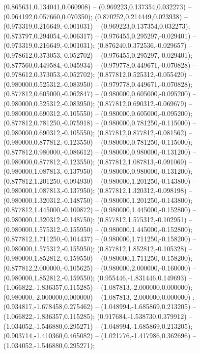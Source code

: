  (0.865631,0.134041,0.060908) -- (0.969223,0.137354,0.032273) -- (0.964192,0.057660,0.070350);
 (0.870252,0.214449,0.023938) -- (0.973319,0.216649,-0.001031) -- (0.969223,0.137354,0.032273);
 (0.873797,0.294054,-0.006317) -- (0.976455,0.295297,-0.029401) -- (0.973319,0.216649,-0.001031);
 (0.876240,0.372536,-0.029657) -- (0.978612,0.373053,-0.052702) -- (0.976455,0.295297,-0.029401);
 (0.877560,0.449584,-0.045934) -- (0.979778,0.449671,-0.070828) -- (0.978612,0.373053,-0.052702);
 (0.877812,0.525312,-0.055420) -- (0.980000,0.525312,-0.083950) -- (0.979778,0.449671,-0.070828);
 (0.877812,0.605000,-0.062847) -- (0.980000,0.605000,-0.095200) -- (0.980000,0.525312,-0.083950);
 (0.877812,0.690312,-0.069679) -- (0.980000,0.690312,-0.105550) -- (0.980000,0.605000,-0.095200);
 (0.877812,0.781250,-0.075918) -- (0.980000,0.781250,-0.115000) -- (0.980000,0.690312,-0.105550);
 (0.877812,0.877812,-0.081562) -- (0.980000,0.877812,-0.123550) -- (0.980000,0.781250,-0.115000);
 (0.877812,0.980000,-0.086612) -- (0.980000,0.980000,-0.131200) -- (0.980000,0.877812,-0.123550);
 (0.877812,1.087813,-0.091069) -- (0.980000,1.087813,-0.137950) -- (0.980000,0.980000,-0.131200);
 (0.877812,1.201250,-0.094930) -- (0.980000,1.201250,-0.143800) -- (0.980000,1.087813,-0.137950);
 (0.877812,1.320312,-0.098198) -- (0.980000,1.320312,-0.148750) -- (0.980000,1.201250,-0.143800);
 (0.877812,1.445000,-0.100872) -- (0.980000,1.445000,-0.152800) -- (0.980000,1.320312,-0.148750);
 (0.877812,1.575312,-0.102951) -- (0.980000,1.575312,-0.155950) -- (0.980000,1.445000,-0.152800);
 (0.877812,1.711250,-0.104437) -- (0.980000,1.711250,-0.158200) -- (0.980000,1.575312,-0.155950);
 (0.877812,1.852812,-0.105328) -- (0.980000,1.852812,-0.159550) -- (0.980000,1.711250,-0.158200);
 (0.877812,2.000000,-0.105625) -- (0.980000,2.000000,-0.160000) -- (0.980000,1.852812,-0.159550);
 (0.955446,-1.831446,0.149693) -- (1.066822,-1.836357,0.115285) -- (1.087813,-2.000000,0.000000);
 (0.980000,-2.000000,0.000000) -- (1.087813,-2.000000,0.000000) ;
 (0.934817,-1.678458,0.275462) -- (1.048994,-1.685869,0.213205) -- (1.066822,-1.836357,0.115285);
 (0.917684,-1.538730,0.379912) -- (1.034052,-1.546880,0.295271) -- (1.048994,-1.685869,0.213205);
 (0.903714,-1.410360,0.465082) -- (1.021776,-1.417986,0.362696) -- (1.034052,-1.546880,0.295271);
